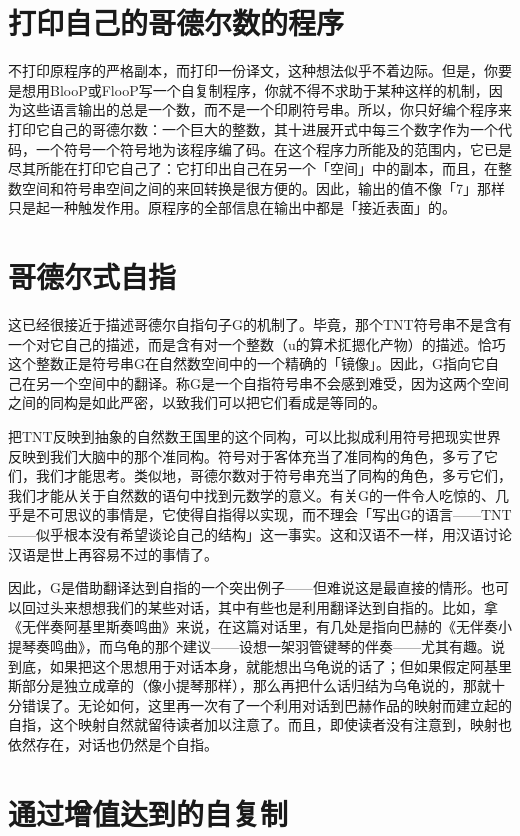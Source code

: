 \documentclass[
  12pt,
  twoside,
  openright,
  oldfontcommands,
]{memoir}
\begin{document}
\section{打印自己的哥德尔数的程序}

不打印原程序的严格副本，而打印一份译文，这种想法似乎不着边际。但是，你要是想用BlooP或FlooP写一个自复制程序，你就不得不求助于某种这样的机制，因为这些语言输出的总是一个数，而不是一个印刷符号串。所以，你只好编个程序来打印它自己的哥德尔数：一个巨大的整数，其十进展开式中每三个数字作为一个代码，一个符号一个符号地为该程序编了码。在这个程序力所能及的范围内，它已是尽其所能在打印它自己了：它打印出自己在另一个「空间」中的副本，而且，在整数空间和符号串空间之间的来回转换是很方便的。因此，输出的值不像「7」那样只是起一种触发作用。原程序的全部信息在输出中都是「接近表面」的。

\section{哥德尔式自指}

这已经很接近于描述哥德尔自指句子G的机制了。毕竟，那个TNT符号串不是含有一个对它自己的描述，而是含有对一个整数（u的算术㧟摁化产物）的描述。恰巧这个整数正是符号串G在自然数空间中的一个精确的「镜像」。因此，G指向它自己在另一个空间中的翻译。称G是一个自指符号串不会感到难受，因为这两个空间之间的同构是如此严密，以致我们可以把它们看成是等同的。

把TNT反映到抽象的自然数王国里的这个同构，可以比拟成利用符号把现实世界反映到我们大脑中的那个准同构。符号对于客体充当了准同构的角色，多亏了它们，我们才能思考。类似地，哥德尔数对于符号串充当了同构的角色，多亏它们，我们才能从关于自然数的语句中找到元数学的意义。有关G的一件令人吃惊的、几乎是不可思议的事情是，它使得自指得以实现，而不理会「写出G的语言------TNT------似乎根本没有希望谈论自己的结构」这一事实。这和汉语不一样，用汉语讨论汉语是世上再容易不过的事情了。

因此，G是借助翻译达到自指的一个突出例子------但难说这是最直接的情形。也可以回过头来想想我们的某些对话，其中有些也是利用翻译达到自指的。比如，拿《无伴奏阿基里斯奏鸣曲》来说，在这篇对话里，有几处是指向巴赫的《无伴奏小提琴奏鸣曲》，而乌龟的那个建议------设想一架羽管键琴的伴奏------尤其有趣。说到底，如果把这个思想用于对话本身，就能想出乌龟说的话了；但如果假定阿基里斯部分是独立成章的（像小提琴那样），那么再把什么话归结为乌龟说的，那就十分错误了。无论如何，这里再一次有了一个利用对话到巴赫作品的映射而建立起的自指，这个映射自然就留待读者加以注意了。而且，即使读者没有注意到，映射也依然存在，对话也仍然是个自指。

\section{通过增值达到的自复制}
\end{document}
